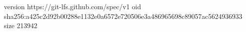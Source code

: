 version https://git-lfs.github.com/spec/v1
oid sha256:a425c2d92b00288e1132e0a6572e720506e3a486965698c89057ac5624936933
size 213942
